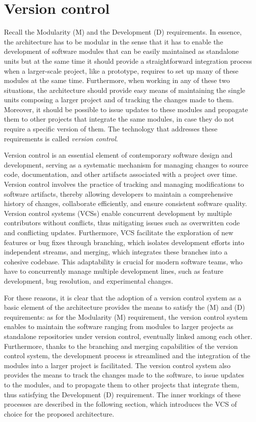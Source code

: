\section{Version control}
\label{sec:version_control}
Recall the Modularity (M) and the Development (D) requirements. In essence, the architecture has to be modular in the sense that it has to enable the development of software modules that can be easily maintained as standalone units but at the same time it should provide a straightforward integration process when a larger-scale project, like a prototype, requires to set up many of these modules at the same time. Furthermore, when working in any of these two situations, the architecture should provide easy means of maintaining the single units composing a larger project and of tracking the changes made to them. Moreover, it should be possible to issue updates to these modules and propagate them to other projects that integrate the same modules, in case they do not require a specific version of them. The technology that addresses these requirements is called \emph{version control}.

Version control \cite{zolkifli_version_2018} is an essential element of contemporary software design and development, serving as a systematic mechanism for managing changes to source code, documentation, and other artifacts associated with a project over time. Version control involves the practice of tracking and managing modifications to software artifacts, thereby allowing developers to maintain a comprehensive history of changes, collaborate efficiently, and ensure consistent software quality. Version control systems (VCSs) enable concurrent development by multiple contributors without conflicts, thus mitigating issues such as overwritten code and conflicting updates. Furthermore, VCS facilitate the exploration of new features or bug fixes through branching, which isolates development efforts into independent streams, and merging, which integrates these branches into a cohesive codebase. This adaptability is crucial for modern software teams, who have to concurrently manage multiple development lines, such as feature development, bug resolution, and experimental changes.

For these reasons, it is clear that the adoption of a version control system as a basic element of the architecture provides the means to satisfy the (M) and (D) requirements: as for the Modularity (M) requirement, the version control system enables to maintain the software ranging from modules to larger projects as standalone repositories under version control, eventually linked among each other. Furthermore, thanks to the branching and merging capabilities of the version control system, the development process is streamlined and the integration of the modules into a larger project is facilitated. The version control system also provides the means to track the changes made to the software, to issue updates to the modules, and to propagate them to other projects that integrate them, thus satisfying the Development (D) requirement. The inner workings of these processes are described in the following section, which introduces the VCS of choice for the proposed architecture.

